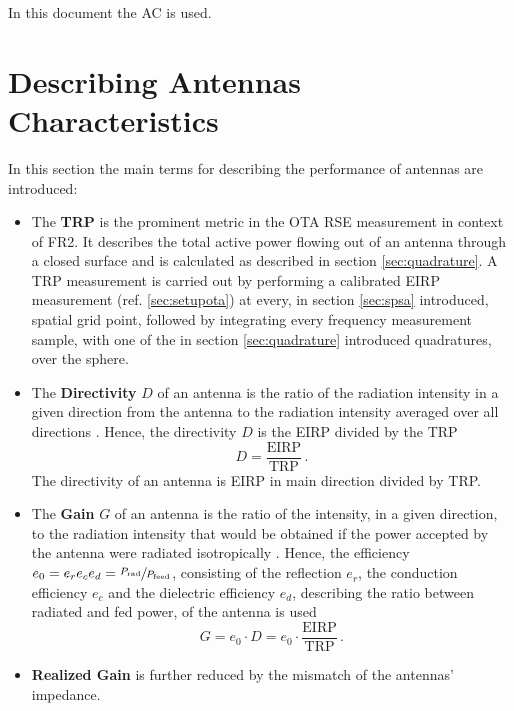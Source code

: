 In this document the \ac{AC} is used.

\section{Describing Antennas Characteristics}
\label{sec:anch}
In this section the main terms for describing the performance of antennas are introduced: \cite{balanis}

\begin{itemize}
\item The \textbf{\acf{TRP}} is the prominent metric in the \ac{OTA} \ac{RSE} measurement in context of \ac{FR2}. It describes the total active power flowing out of an antenna through a closed surface and is calculated as described in section \ref{sec:quadrature}. A \ac{TRP} measurement is carried out by performing a calibrated \ac{EIRP} measurement (ref. \ref{sec:setupota}) at every, in section \ref{sec:spsa} introduced, spatial grid point, followed by integrating every frequency measurement sample, with one of the in section \ref{sec:quadrature} introduced quadratures, over the sphere.
\item The \textbf{Directivity} $D$ of an antenna is \glqq the ratio of the radiation intensity in a given direction from the antenna to the radiation intensity averaged over all directions\grqq{} \cite{ieeeantenna}. Hence, the directivity $D$ is the \ac{EIRP} divided by the \ac{TRP}
\begin{equation}
D = \frac{\text{EIRP}}{\text{TRP}}\,.
\end{equation}
The directivity of an antenna is \ac{EIRP} in main direction divided by \ac{TRP}.
\item The \textbf{Gain} $G$ of an antenna is \glqq the ratio of the intensity, in a given direction, to the radiation intensity that would be obtained if the power accepted by the antenna were radiated isotropically\grqq{} \cite{ieeeantenna}. Hence, the efficiency $e_0=e_re_ce_d=\sfrac{P_\text{rad}}{P_\text{feed}}$, consisting of the reflection $e_r$, the conduction efficiency $e_c$ and the dielectric efficiency $e_d$, describing the ratio between radiated and fed power, of the antenna is used
\begin{equation}
G = e_0\cdot D=e_0\cdot\frac{\text{EIRP}}{\text{TRP}}\,.
\end{equation}
\item \textbf{Realized Gain} is further reduced by the mismatch of the antennas' impedance. \cite{ieeeantenna}
\end{itemize}

